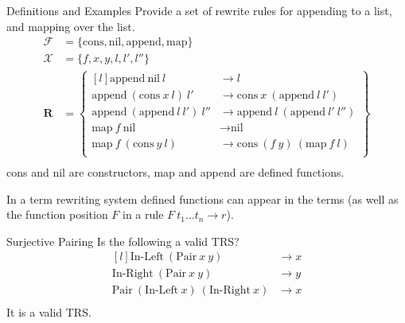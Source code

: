 \begin{examplebox}{Definitions and Examples}
    Provide a set of rewrite rules for appending to a list, and mapping over the list.
    \tcblower
    \[\begin{split}
        \mathcal{F} &= \{\text{cons}, \text{nil}, \text{append}, \text{map}\} \\
        \mathcal{X} & = \{f, x, y, l, l', l''\} \\
        \mathbf{R} &= \begin{Bmatrix*}[l]
            \text{append} \ \text{nil} \ l & \to l \\
            \text{append} \ (\text{cons} \ x \ l) \ l' & \to \text{cons} \ x \ (\text{append} \ l \ l') \\
            \text{append} \ (\text{append} \ l \ l') \ l'' & \to \text{append} \ l \ (\text{append} \ l' \ l'') \\
            \text{map} \ f \ \text{nil} & \to \text{nil} \\
            \text{map} \ f \ (\text{cons} \ y \ l) & \to \text{cons} \ (f \ y) \ (\text{map} \ f \ l) \\
        \end{Bmatrix*} \\
    \end{split}\]
    cons and nil are constructors, map and append are defined functions.
\end{examplebox}

In a term rewriting system defined functions can appear in the terms (as well as the function position $F$ in a rule $F \ t_1 \dots t_n \to r$).

\begin{examplebox}{Surjective Pairing}
    Is the following a valid TRS?
    \[\begin{matrix*}[l]
        \text{In-Left} \ (\text{Pair} \ x \ y) & \to x \\
        \text{In-Right} \ (\text{Pair} \ x \ y) & \to y \\
        \text{Pair} \ (\text{In-Left} \ x) \ (\text{In-Right} \ x) & \to x \\
    \end{matrix*}\]
    \tcblower
    It is a valid TRS.
\end{examplebox}

